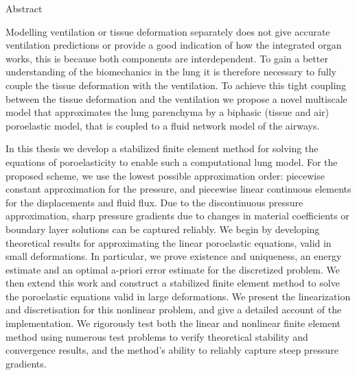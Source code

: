 \begin{comment}

{
\Large
\noindent\makebox[0in][l]{\xauthor}\hfill\makebox[6in][r]{Doctor of
Philosophy} \vskip 2pt
\noindent{\xcollege}\hfill\makebox[4.9in][r]{\xterm}
}

\vskip 1cm

{
\Large \bf
\begin{center}
{\xtitle}
\end{center}
}
\end{comment}

{
\large\bf
\begin{center}
Abstract
\end{center}
}
%
\noindent Modelling ventilation or tissue deformation separately does not give accurate ventilation predictions or provide a good indication of how the integrated organ works, this is because both components are interdependent. To gain a better understanding of the biomechanics in the lung it is therefore necessary to fully couple the tissue deformation with the ventilation. To achieve this tight coupling between the tissue deformation and the ventilation we propose a novel multiscale model that approximates the lung parenchyma by a biphasic (tissue and air) poroelastic model, that is coupled to a fluid network model of the airways. 

In this thesis we develop a stabilized finite element method for solving the equations of poroelasticity to enable such a computational lung model. For the proposed scheme, we use the lowest possible approximation order: piecewise constant approximation for the pressure, and piecewise linear continuous elements for the displacements and fluid flux. Due to the discontinuous pressure approximation, sharp pressure gradients due to changes in material coefficients or boundary layer solutions can be captured reliably. We begin by developing theoretical results for approximating the linear poroelastic equations, valid in small deformations. In particular, we prove existence and uniqueness, an energy estimate and an optimal a-priori error estimate for the discretized problem. 
%
%
%
We then extend this work and construct a stabilized finite element method to solve the poroelastic equations valid in large deformations. We present the linearization and discretisation for this nonlinear problem, and give a detailed account of the implementation. We rigorously test both the linear and nonlinear finite element method using numerous test problems to verify theoretical stability and convergence results, and the method's ability to reliably capture steep pressure gradients. 

